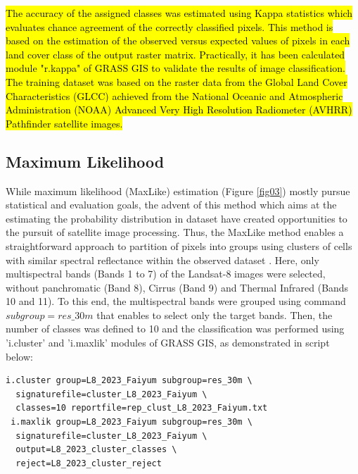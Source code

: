 \documentclass[final,5p,times,twocolumn]{elsarticle}
\numberwithin{table}{section}
\begin{document}
\hl{The accuracy of the assigned classes was estimated using Kappa statistics which evaluates chance agreement of the correctly classified pixels. This method is based on the estimation of the observed versus expected values of pixels in each land cover class of the output raster matrix. Practically, it has been calculated module "r.kappa" of GRASS GIS to validate the results of image classification. The training dataset was based on the raster data from the Global Land Cover Characteristics (GLCC) achieved from the National Oceanic and Atmospheric Administration (NOAA) Advanced Very High Resolution Radiometer (AVHRR) Pathfinder satellite images.}

\subsection{Maximum Likelihood}
While maximum likelihood (MaxLike) estimation (Figure \ref{fig03}) mostly pursue statistical and evaluation goals, the advent of this method which aims at the estimating the probability distribution in dataset have created opportunities to the pursuit of satellite image processing. Thus, the MaxLike method enables a straightforward approach to partition of pixels into groups using clusters of cells with similar spectral reflectance within the observed dataset \cite{6079300}. Here, only multispectral bands (Bands 1 to 7) of the Landsat-8 images were selected, without panchromatic (Band 8), Cirrus (Band 9) and Thermal Infrared  (Bands 10 and 11). To this end, the multispectral bands were grouped using command $subgroup=res\_30m$ that enables to select only the target bands. Then, the number of classes was defined to 10 and the classification was performed using 'i.cluster' and 'i.maxlik' modules of GRASS GIS, as demonstrated in script below: 

\begin{footnotesize}
\begin{verbatim}
i.cluster group=L8_2023_Faiyum subgroup=res_30m \
  signaturefile=cluster_L8_2023_Faiyum \
  classes=10 reportfile=rep_clust_L8_2023_Faiyum.txt
 i.maxlik group=L8_2023_Faiyum subgroup=res_30m \
  signaturefile=cluster_L8_2023_Faiyum \
  output=L8_2023_cluster_classes \
  reject=L8_2023_cluster_reject
\end{verbatim}
\end{footnotesize}
\end{document}
